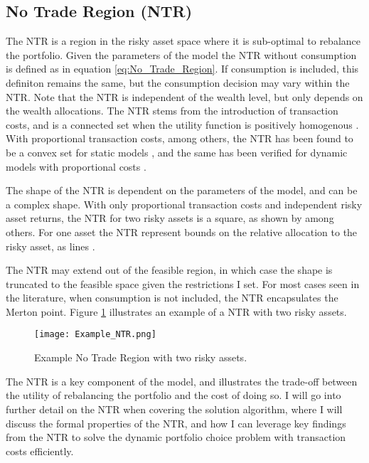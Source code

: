 \documentclass[11pt]{article}
\begin{document}
\subsection{No Trade Region (NTR)} \label{Subsection: No-trade-region}
The \ac{NTR} is a region in the risky asset space where
it is sub-optimal to rebalance the portfolio.
Given the parameters of the model the \ac{NTR} without consumption is defined as in equation \eqref{eq:No_Trade_Region}.
If consumption is included, this definiton remains the same, but the consumption decision may vary within the \ac{NTR}.
Note that the \ac{NTR} is independent of the wealth level, but only depends on the wealth allocations.
The \ac{NTR} stems from the introduction of transaction costs, and is a connected set when the utility function is positively homogenous \autocite{Abrams1980}.
With proportional transaction costs, among others, the \ac{NTR} has been found to be a convex set for static models \autocite{Dybvig2020},
and the same has been verified for dynamic models with proportional costs \autocite{CaiJuddXu2013}.

The shape of the \ac{NTR} is dependent on the parameters of the model, and can be a complex shape.
With only proportional transaction costs and independent risky asset returns, the \ac{NTR} for two risky assets
is a square, as shown by \textcite{Aikan1996} among others. 
For one asset the \ac{NTR} represent bounds on the relative allocation to the risky asset, as lines \autocite{DavisNorman1990}.

The NTR may extend out of the feasible region, in which case the shape is truncated to the feasible space given the restrictions I set.
For most cases seen in the literature, when consumption is not included, the \ac{NTR} encapsulates the Merton point.
Figure \ref{fig: NTR_Example} illustrates an example of a \ac{NTR} with two risky assets.
\begin{figure}[h!]
  \begin{center}
  \caption{Example No Trade Region with two risky assets.} 
  \label{fig: NTR_Example}
  \texttt{[image: Example\_NTR.png]}
  \end{center}
\end{figure}
The \ac{NTR} is a key component of the model, and illustrates the trade-off between the utility of rebalancing the portfolio and the cost of doing so.
I will go into further detail on the \ac{NTR} when covering the solution algorithm, where I will discuss the formal properties of the \ac{NTR},
and how I can leverage key findings from the \ac{NTR} to solve the dynamic portfolio choice problem with transaction costs efficiently.
\end{document}
